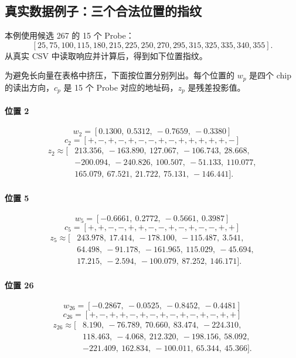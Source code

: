\documentclass[UTF8,a4paper,11pt]{ctexart}
\begin{document}
\subsection{真实数据例子：三个合法位置的指纹}

本例使用候选 267 的 15 个 Probe：
\[
[25,75,100,115,180,215,225,250,270,295,315,325,335,340,355].
\]
从真实 CSV 中读取响应并计算后，得到如下位置指纹。

为避免长向量在表格中挤压，下面按位置分别列出。每个位置的 $w_p$ 是四个 chip 的读出方向，$c_p$ 是 15 个 Probe 对应的地址码，$z_p$ 是残差投影值。

\paragraph{位置 2}
\[
w_2=[0.1300,\ 0.5312,\ -0.7659,\ -0.3380]
\]
\[
c_2=[+,-,+,-,+,-,-,+,-,+,+,+,+,+,-]
\]
\begin{align*}
z_2\approx[&213.356,\ -163.890,\ 127.067,\ -106.743,\ 28.668,\\
&-200.094,\ -240.826,\ 100.507,\ -51.133,\ 110.077,\\
&165.079,\ 67.521,\ 21.722,\ 75.131,\ -146.441].
\end{align*}

\paragraph{位置 5}
\[
w_5=[-0.6661,\ 0.2772,\ -0.5661,\ 0.3987]
\]
\[
c_5=[+,+,-,-,+,+,-,-,+,-,+,-,-,+,+]
\]
\begin{align*}
z_5\approx[&243.978,\ 17.414,\ -178.100,\ -115.487,\ 3.541,\\
&64.498,\ -91.178,\ -161.965,\ 115.029,\ -45.694,\\
&17.215,\ -2.594,\ -100.079,\ 87.252,\ 146.171].
\end{align*}

\paragraph{位置 26}
\[
w_{26}=[-0.2867,\ -0.0525,\ -0.8452,\ -0.4481]
\]
\[
c_{26}=[+,-,+,+,-,+,-,+,-,+,-,+,-,+,+]
\]
\begin{align*}
z_{26}\approx[&8.190,\ -76.789,\ 70.660,\ 83.474,\ -224.310,\\
&118.463,\ -4.068,\ 212.320,\ -198.156,\ 58.092,\\
&-221.409,\ 162.834,\ -100.011,\ 65.344,\ 45.366].
\end{align*}
\end{document}
